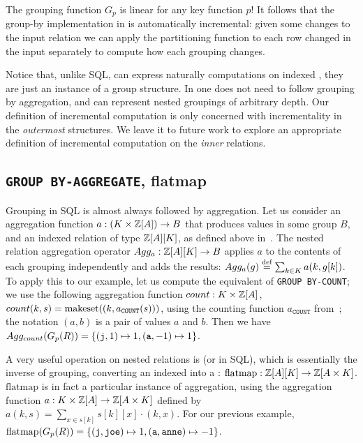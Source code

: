 The grouping function $G_p$ is linear for any key function $p$!
It follows that the group-by implementation in \dbsp is automatically
incremental: given some changes
to the input relation we can apply the partitioning function
to each row changed in the input separately to compute how each grouping changes.

Notice that, unlike SQL, \dbsp can express naturally computations
on indexed \zrs, they are just an instance of a group structure.
In \dbsp one does not need to follow
grouping by aggregation, and \dbsp can represent nested groupings
of arbitrary depth.  Our definition of incremental
computation is only concerned with incrementality in the
\emph{outermost} structures.  We leave it to future work to
explore an appropriate definition of incremental computation
on the \emph{inner} relations.


\subsection{\texttt{GROUP BY-AGGREGATE}, flatmap}

Grouping in SQL is almost always followed by aggregation.
Let us consider an aggregation function $a: (K \times \mathbb{Z}[A]) \to B$ that produces values
in some group $B$, and an indexed relation of type $\mathbb{Z}[A][K]$, as defined above in~.
The nested relation aggregation operator $Agg_a: \mathbb{Z}[A][K] \to B$ applies $a$
to the contents of each grouping independently and adds the results:
$Agg_a(g) \stackrel{\textrm{\scriptsize def}}{=} \sum_{k \in K} a(k, g[k])$.  To apply this
to our example, let us compute the equivalent of \texttt{GROUP BY-COUNT}; we use
the following aggregation function $count: K \times \mathbb{Z}[A]$, $count(k, s) =
\mbox{makeset}((k, a_\texttt{COUNT}(s)))$, using the \zr counting function $a_\texttt{COUNT}$
from~; the notation $(a,b)$ is a pair of values $a$ and $b$.
Then we have $Agg_{count} (G_p(R)) = \{ (\mbox{\texttt{j}}, 1) \mapsto 1,
(\mbox{\texttt{a}}, -1) \mapsto 1 \}$.


A very useful operation on nested relations is  (or  in SQL), which is
essentially the inverse of grouping, converting an indexed
\zr into a \zr: $\mbox{flatmap}: \mathbb{Z}[A][K] \to \mathbb{Z}[A \times K]$.
$\mbox{flatmap}$ is in fact a particular instance of aggregation,
using the aggregation function $a: K \times \mathbb{Z}[A] \to \mathbb{Z}[A \times K]$
defined by $a(k, s) = \sum_{x \in s[k]} s[k][x] \cdot (k, x).$
For our previous example, $\mbox{flatmap}(G_p(R)) = \{ (\mbox{\texttt{j}}, \mbox{\texttt{joe}}) \mapsto 1,
(\mbox{\texttt{a}}, \mbox{\texttt{anne}}) \mapsto -1 \}$.

